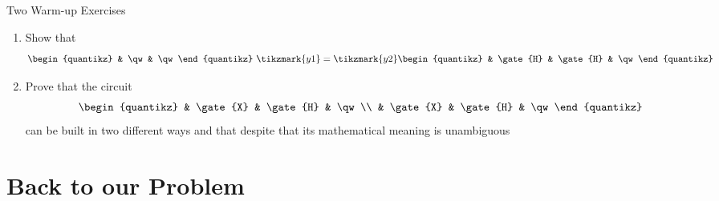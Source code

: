 \documentclass{beamer}
\begin{document}
\begin{frame}{Two Warm-up Exercises}
        \begin{enumerate}
                \item Show that
                        \[
                        \begin{quantikz}
                                & \qw & \qw 
                        \end{quantikz}\
                        \tikzmark{y1} = \tikzmark{y2}
                        \begin{quantikz}
                                & \gate{H} & \gate{H} & \qw 
                        \end{quantikz}
                        \]

                        \vspace{1.2cm}
                \item Prove that the circuit
                        \[
                        \begin{quantikz}
                                & \gate{X} & \gate{H} & \qw \\
                                & \gate{X} & \gate{H} & \qw
                        \end{quantikz}
                        \]
                       can be built in two different ways and that despite that
                       its mathematical meaning is unambiguous
       \end{enumerate}


\end{frame}

\section{Back to our Problem}
\end{document}
